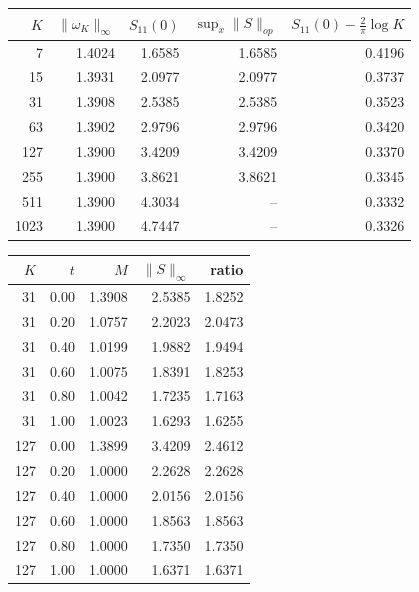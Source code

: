 \begin{center}\small\begin{tabular}{rrrrr}$K$&$\|\omega_K\|_\infty$&$S_{11}(0)$&$\sup_x\|S\|_{op}$&$S_{11}(0)-\tfrac2\pi\log K$\\\hline
7 & 1.4024 & 1.6585 & 1.6585 & 0.4196 \\
15 & 1.3931 & 2.0977 & 2.0977 & 0.3737 \\
31 & 1.3908 & 2.5385 & 2.5385 & 0.3523 \\
63 & 1.3902 & 2.9796 & 2.9796 & 0.3420 \\
127 & 1.3900 & 3.4209 & 3.4209 & 0.3370 \\
255 & 1.3900 & 3.8621 & 3.8621 & 0.3345 \\
511 & 1.3900 & 4.3034 & -- & 0.3332 \\
1023 & 1.3900 & 4.7447 & -- & 0.3326 \\
\end{tabular}\end{center}
\begin{center}\small\begin{tabular}{rrrrr}$K$&$t$&$M$&$\|S\|_\infty$&ratio\\\hline
31 & 0.00 & 1.3908 & 2.5385 & 1.8252 \\
31 & 0.20 & 1.0757 & 2.2023 & 2.0473 \\
31 & 0.40 & 1.0199 & 1.9882 & 1.9494 \\
31 & 0.60 & 1.0075 & 1.8391 & 1.8253 \\
31 & 0.80 & 1.0042 & 1.7235 & 1.7163 \\
31 & 1.00 & 1.0023 & 1.6293 & 1.6255 \\
127 & 0.00 & 1.3899 & 3.4209 & 2.4612 \\
127 & 0.20 & 1.0000 & 2.2628 & 2.2628 \\
127 & 0.40 & 1.0000 & 2.0156 & 2.0156 \\
127 & 0.60 & 1.0000 & 1.8563 & 1.8563 \\
127 & 0.80 & 1.0000 & 1.7350 & 1.7350 \\
127 & 1.00 & 1.0000 & 1.6371 & 1.6371 \\
\end{tabular}\end{center}
